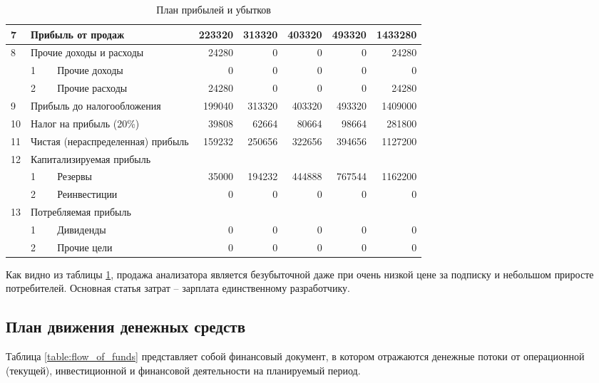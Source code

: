 \begin{table}[!h]
{\begin{tabular}{l|l|l|r|r|r|r|r|}
				\multicolumn{1}{|l|}{7} & \multicolumn{2}{l|}{Прибыль от продаж} & 223320 & 313320 & 403320 & 493320 & 1433280 \\ \hline
				\multicolumn{1}{|l|}{8} & \multicolumn{2}{l|}{Прочие доходы и расходы} & 24280 & 0 & 0 & 0 & 24280 \\ \hline
				& 1 & Прочие доходы & 0 & 0 & 0 & 0 & 0 \\ \cline{2-8} 
				& 2 & Прочие расходы & 24280 & 0 & 0 & 0 & 24280 \\ \hline
				\multicolumn{1}{|l|}{9} & \multicolumn{2}{l|}{Прибыль до налогообложения} & 199040 & 313320 & 403320 & 493320 & 1409000  \\ \hline
				\multicolumn{1}{|l|}{10} & \multicolumn{2}{l|}{Налог на прибыль (20\%)} & 39808 & 62664 & 80664 & 98664 & 281800 \\ \hline
				\multicolumn{1}{|l|}{11} & \multicolumn{2}{l|}{Чистая (нераспределенная) прибыль} & 159232 & 250656 & 322656 & 394656 & 1127200 \\ \hline
				\multicolumn{1}{|l|}{12} & \multicolumn{2}{l|}{Капитализируемая прибыль} & \multicolumn{5}{l|}{} \\ \hline
				& 1 & Резервы & 35000 & 194232 & 444888 & 767544 & 1162200 \\ \cline{2-8} 
				& 2 & Реинвестиции & 0 & 0 & 0 & 0 & 0 \\ \hline
				\multicolumn{1}{|l|}{13} & \multicolumn{2}{l|}{Потребляемая прибыль} & \multicolumn{5}{l|}{} \\ \hline
				& 1 & Дивиденды & 0 & 0 & 0 & 0 & 0 \\ \cline{2-8} 
				& 2 & Прочие цели & 0 & 0 & 0 & 0 & 0 \\ \cline{2-8} 
			\end{tabular}%
		}
		\caption{План прибылей и убытков}
		\label{table:profit_and_loss}
	\end{table}
	Как видно из таблицы \ref{table:profit_and_loss}, продажа анализатора является безубыточной даже при очень низкой цене за подписку и небольшом приросте потребителей. Основная статья затрат -- зарплата единственному разработчику.

\subsection{План движения денежных средств} 
	Таблица \ref{table:flow_of_funds} представляет собой финансовый документ, в котором отражаются денежные потоки от операционной (текущей), инвестиционной и финансовой деятельности на планируемый период.

